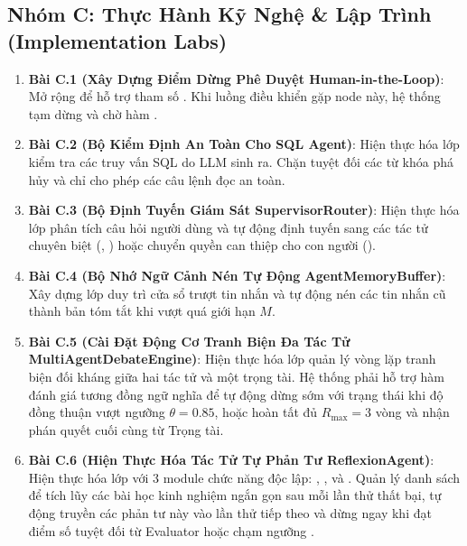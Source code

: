 \subsection{Nhóm C: Thực Hành Kỹ Nghệ \& Lập Trình (Implementation Labs)}
\begin{enumerate}
  \item \textbf{Bài C.1 (Xây Dựng Điểm Dừng Phê Duyệt Human-in-the-Loop)}:
  Mở rộng  để hỗ trợ tham số . Khi luồng điều khiển gặp node này, hệ thống tạm dừng và chờ hàm .

  \item \textbf{Bài C.2 (Bộ Kiểm Định An Toàn Cho SQL Agent)}:
  Hiện thực hóa lớp  kiểm tra các truy vấn SQL do LLM sinh ra. Chặn tuyệt đối các từ khóa phá hủy và chỉ cho phép các câu lệnh đọc  an toàn.

  \item \textbf{Bài C.3 (Bộ Định Tuyến Giám Sát SupervisorRouter)}:
  Hiện thực hóa lớp  phân tích câu hỏi người dùng và tự động định tuyến sang các tác tử chuyên biệt (, ) hoặc chuyển quyền can thiệp cho con người ().

  \item \textbf{Bài C.4 (Bộ Nhớ Ngữ Cảnh Nén Tự Động AgentMemoryBuffer)}:
  Xây dựng lớp  duy trì cửa sổ trượt tin nhắn và tự động nén các tin nhắn cũ thành bản tóm tắt khi vượt quá giới hạn $M$.

  \item \textbf{Bài C.5 (Cài Đặt Động Cơ Tranh Biện Đa Tác Tử MultiAgentDebateEngine)}:
  Hiện thực hóa lớp  quản lý vòng lặp tranh biện đối kháng giữa hai tác tử và một trọng tài. Hệ thống phải hỗ trợ hàm đánh giá tương đồng ngữ nghĩa  để tự động dừng sớm với trạng thái  khi độ đồng thuận vượt ngưỡng $\theta = 0.85$, hoặc hoàn tất đủ $R_{\max} = 3$ vòng và nhận phán quyết cuối cùng từ Trọng tài.

  \item \textbf{Bài C.6 (Hiện Thực Hóa Tác Tử Tự Phản Tư ReflexionAgent)}:
  Hiện thực hóa lớp  với 3 module chức năng độc lập: , , và . Quản lý danh sách  để tích lũy các bài học kinh nghiệm ngắn gọn sau mỗi lần thử thất bại, tự động truyền các phản tư này vào lần thử tiếp theo và dừng ngay khi đạt điểm số tuyệt đối từ Evaluator hoặc chạm ngưỡng .


\end{enumerate}
